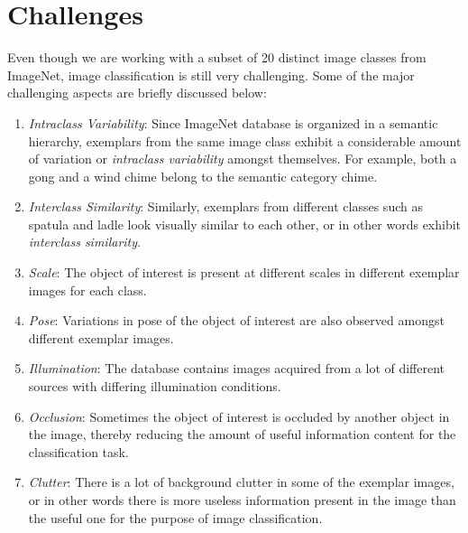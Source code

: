 \documentclass[12pt]{article}
\begin{document}
\section{Challenges}
Even though we are working with a subset of 20 distinct image classes from ImageNet, image classification is still very challenging. Some of the major challenging aspects are briefly discussed below:
\begin{enumerate}
\item \textit{Intraclass Variability}: Since ImageNet database is organized in a semantic hierarchy, exemplars from the same image class exhibit a considerable amount of variation or \textit{intraclass variability} amongst themselves. For example, both a gong and a wind chime belong to the semantic category chime.
\item \textit{Interclass Similarity}: Similarly, exemplars from different classes such as spatula and ladle look visually similar to each other, or in other words exhibit \textit{interclass similarity}.
\item \textit{Scale}: The object of interest is present at different scales in different exemplar images for each class.
\item \textit{Pose}: Variations in pose of the object of interest are also observed amongst different exemplar images.
\item \textit{Illumination}: The database contains images acquired from a lot of different sources with differing illumination conditions.
\item \textit{Occlusion}: Sometimes the object of interest is occluded by another object in the image, thereby reducing the amount of useful information content for the classification task.
\item \textit{Clutter}: There is a lot of background clutter in some of the exemplar images, or in other words there is more useless information present in the image than the useful one for the purpose of image classification.
\end{enumerate}




\end{document}
